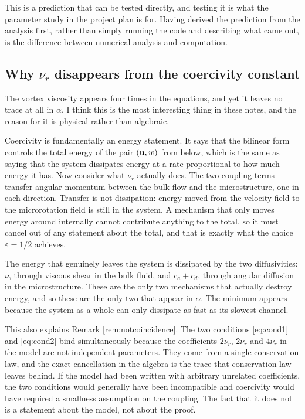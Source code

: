 \documentclass[11pt,a4paper]{article}
\begin{document}
This is a prediction that can be tested directly, and testing it is what the
parameter study in the project plan is for. Having derived the prediction from
the analysis first, rather than simply running the code and describing what
came out, is the difference between numerical analysis and computation.

\subsection{Why $\nu_{r}$ disappears from the coercivity constant}

The vortex viscosity appears four times in the equations, and yet it leaves no
trace at all in $\alpha$. I think this is the most interesting thing in these
notes, and the reason for it is physical rather than algebraic.

Coercivity is fundamentally an energy statement. It says that the bilinear form
controls the total energy of the pair $(\mathbf{u}, w)$ from below, which is the same
as saying that the system dissipates energy at a rate proportional to how much
energy it has. Now consider what $\nu_{r}$ actually does. The two coupling terms
transfer angular momentum between the bulk flow and the microstructure, one in
each direction. Transfer is not dissipation: energy moved from the velocity
field to the microrotation field is still in the system. A mechanism that only
moves energy around internally cannot contribute anything to the total, so it
must cancel out of any statement about the total, and that is exactly what the
choice $\varepsilon = 1/2$ achieves.

The energy that genuinely leaves the system is dissipated by the two
diffusivities: $\nu$, through viscous shear in the bulk fluid, and
$c_{a} + c_{d}$, through angular diffusion in the microstructure. These are the
only two mechanisms that actually destroy energy, and so these are the only two
that appear in $\alpha$. The minimum appears because the system as a whole can
only dissipate as fast as its slowest channel.

This also explains Remark \ref{rem:notcoincidence}. The two conditions
\eqref{eq:cond1} and \eqref{eq:cond2} bind simultaneously because the
coefficients $2\nu_{r}$, $2\nu_{r}$ and $4\nu_{r}$ in the model are not
independent parameters. They come from a single conservation law, and the exact
cancellation in the algebra is the trace that conservation law leaves behind. If
the model had been written with arbitrary unrelated coefficients, the two
conditions would generally have been incompatible and coercivity would have
required a smallness assumption on the coupling. The fact that it does not is a
statement about the model, not about the proof.
\end{document}
